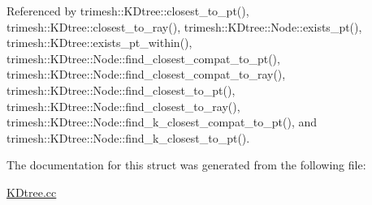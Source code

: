 Referenced by trimesh\+::\+K\+Dtree\+::closest\+\_\+to\+\_\+pt(), trimesh\+::\+K\+Dtree\+::closest\+\_\+to\+\_\+ray(), trimesh\+::\+K\+Dtree\+::\+Node\+::exists\+\_\+pt(), trimesh\+::\+K\+Dtree\+::exists\+\_\+pt\+\_\+within(), trimesh\+::\+K\+Dtree\+::\+Node\+::find\+\_\+closest\+\_\+compat\+\_\+to\+\_\+pt(), trimesh\+::\+K\+Dtree\+::\+Node\+::find\+\_\+closest\+\_\+compat\+\_\+to\+\_\+ray(), trimesh\+::\+K\+Dtree\+::\+Node\+::find\+\_\+closest\+\_\+to\+\_\+pt(), trimesh\+::\+K\+Dtree\+::\+Node\+::find\+\_\+closest\+\_\+to\+\_\+ray(), trimesh\+::\+K\+Dtree\+::\+Node\+::find\+\_\+k\+\_\+closest\+\_\+compat\+\_\+to\+\_\+pt(), and trimesh\+::\+K\+Dtree\+::\+Node\+::find\+\_\+k\+\_\+closest\+\_\+to\+\_\+pt().



The documentation for this struct was generated from the following file\+:\begin{DoxyCompactItemize}
\item 
\hyperlink{KDtree_8cc}{K\+Dtree.\+cc}\end{DoxyCompactItemize}

